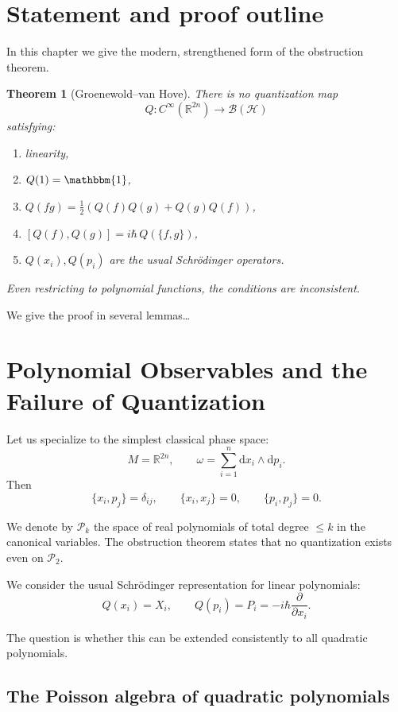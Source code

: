 \documentclass[12pt,oneside]{book}
\theoremstyle{plain}
\newtheorem{theorem}{Theorem}[chapter]
\theoremstyle{definition}
\begin{document}
\section{Statement and proof outline}

In this chapter we give the modern, strengthened form of the obstruction theorem.

\begin{theorem}[Groenewold–van Hove]
There is no quantization map
\[
Q: C^\infty(\mathbb{R}^{2n}) \to \mathcal{B}(\mathcal{H})
\]
satisfying:
\begin{enumerate}[label=(\roman*)]
\item linearity,
\item $Q(1)=\mathbbm{1}$,
\item $Q(fg)=\frac12(Q(f)Q(g)+Q(g)Q(f))$,
\item $[Q(f),Q(g)] = i\hbar\,Q(\{f,g\})$,
\item $Q(x_i),Q(p_i)$ are the usual Schrödinger operators.
\end{enumerate}
Even restricting to polynomial functions, the conditions are inconsistent.
\end{theorem}

We give the proof in several lemmas…


\section{Polynomial Observables and the Failure of Quantization}

Let us specialize to the simplest classical phase space:
\[
M = \mathbb{R}^{2n},\qquad
\omega = \sum_{i=1}^n \mathrm{d}x_i \wedge \mathrm{d}p_i.
\]
Then
\[
\{x_i,p_j\} = \delta_{ij},\qquad
\{x_i,x_j\}=0,\qquad
\{p_i,p_j\}=0.
\]

We denote by $\mathcal{P}_k$ the space of real polynomials of total degree $\le k$ in the canonical variables.
The obstruction theorem states that no quantization exists even on $\mathcal{P}_2$.

We consider the usual Schrödinger representation for linear polynomials:
\[
Q(x_i)=X_i,\qquad
Q(p_i)=P_i=-i\hbar\frac{\partial}{\partial x_i}.
\]

The question is whether this can be extended consistently to all quadratic polynomials.

\subsection{The Poisson algebra of quadratic polynomials}
\end{document}
